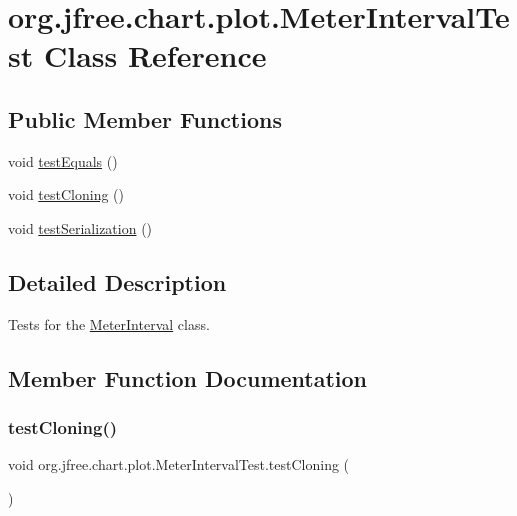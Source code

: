 \hypertarget{classorg_1_1jfree_1_1chart_1_1plot_1_1_meter_interval_test}{}\section{org.\+jfree.\+chart.\+plot.\+Meter\+Interval\+Test Class Reference}
\label{classorg_1_1jfree_1_1chart_1_1plot_1_1_meter_interval_test}
\subsection*{Public Member Functions}
\begin{DoxyCompactItemize}
\item 
void \mbox{\hyperlink{classorg_1_1jfree_1_1chart_1_1plot_1_1_meter_interval_test_a737fe663c8cdd34e9678581142e0892e}{test\+Equals}} ()
\item 
void \mbox{\hyperlink{classorg_1_1jfree_1_1chart_1_1plot_1_1_meter_interval_test_aca51ba70130d2f6631b4b3ca461f64c2}{test\+Cloning}} ()
\item 
void \mbox{\hyperlink{classorg_1_1jfree_1_1chart_1_1plot_1_1_meter_interval_test_a76730ac1d6ae3d0cb8fee82852246d53}{test\+Serialization}} ()
\end{DoxyCompactItemize}


\subsection{Detailed Description}
Tests for the \mbox{\hyperlink{classorg_1_1jfree_1_1chart_1_1plot_1_1_meter_interval}{Meter\+Interval}} class. 

\subsection{Member Function Documentation}
\mbox{\label{classorg_1_1jfree_1_1chart_1_1plot_1_1_meter_interval_test_aca51ba70130d2f6631b4b3ca461f64c2}} 
\subsubsection{\texorpdfstring{test\+Cloning()}{testCloning()}}
{\footnotesize\ttfamily void org.\+jfree.\+chart.\+plot.\+Meter\+Interval\+Test.\+test\+Cloning (\begin{DoxyParamCaption}{ }\end{DoxyParamCaption})}

